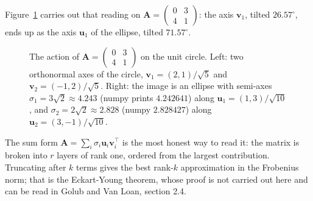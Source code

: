 Figure~\ref{fig:svd-lingkaran-elips} carries out that reading on
$\mathbf{A}=\begin{pmatrix}0&3\\4&1\end{pmatrix}$: the axis $\mathbf{v}_{1}$, tilted
$26.57^\circ$, ends up as the axis $\mathbf{u}_{1}$ of the ellipse, tilted
$71.57^\circ$.

\begin{figure}[htbp]
\centering
{}
\hfill
{}
\caption{The action of $\mathbf{A}=\begin{pmatrix}0&3\\4&1\end{pmatrix}$ on the unit circle.
Left: two orthonormal axes of the circle, $\mathbf{v}_{1}=(2,1)/\sqrt{5}$ and
$\mathbf{v}_{2}=(-1,2)/\sqrt{5}$. Right: the image is an ellipse with semi-axes
$\sigma_{1}=3\sqrt{2}\approx4.243$ (numpy prints $4.242641$) along
$\mathbf{u}_{1}=(1,3)/\sqrt{10}$, and $\sigma_{2}=2\sqrt{2}\approx2.828$ (numpy
$2.828427$) along $\mathbf{u}_{2}=(3,-1)/\sqrt{10}$.}
\label{fig:svd-lingkaran-elips}
\end{figure}

The sum form $\mathbf{A}=\sum_{i}\sigma_{i}\mathbf{u}_{i}\mathbf{v}_{i}^{\top}$
is the most honest way to read it: the matrix is broken into $r$ layers of rank
one, ordered from the largest contribution. Truncating after $k$ terms gives the best
rank-$k$ approximation in the Frobenius norm; that is the Eckart-Young theorem, whose proof
is not carried out here and can be read in Golub and Van Loan, section 2.4.

